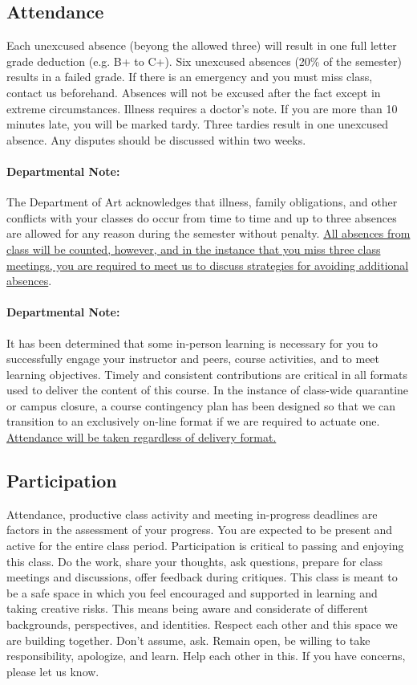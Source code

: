 \subsection{Attendance}

Each unexcused absence (beyong the allowed three) will result in one full letter grade deduction (e.g. B+ to C+). Six unexcused absences (20\% of the semester) results in a failed grade. If there is an emergency and you must miss class, contact us beforehand. Absences will not be excused after the fact except in extreme circumstances. Illness requires a doctor’s note. If you are more than 10 minutes late, you will be marked tardy. Three tardies result in one unexcused absence. Any disputes should be discussed within two weeks.

\paragraph{Departmental Note:} The Department of Art acknowledges that illness, family obligations, and other conflicts with your classes do occur from time to time and up to three absences are allowed for any reason during the semester without penalty. \ul{All absences from class will be counted, however, and in the instance that you miss three class meetings, you are required to meet us to discuss strategies for avoiding additional absences}.

\paragraph{Departmental Note:} It has been determined that some in-person learning is necessary for you to successfully engage your instructor and peers, course activities, and to meet learning objectives. Timely and consistent contributions are critical in all formats used to deliver the content of this course. In the instance of class-wide quarantine or campus closure, a course contingency plan has been designed so that we can transition to an exclusively on-line format if we are required to actuate one. \ul{Attendance will be taken regardless of delivery format.}


\subsection{Participation}

Attendance, productive class activity and meeting in-progress deadlines are factors in the assessment of your progress. You are expected to be present and active for the entire class period. Participation is critical to passing and enjoying this class. Do the work, share your thoughts, ask questions, prepare for class meetings and discussions, offer feedback during critiques. This class is meant to be a safe space in which you feel encouraged and supported in learning and taking creative risks. This means being aware and considerate of different backgrounds, perspectives, and identities. Respect each other and this space we are building together. Don’t assume, ask. Remain open, be willing to take responsibility, apologize, and learn. Help each other in this. If you have concerns, please let us know.

